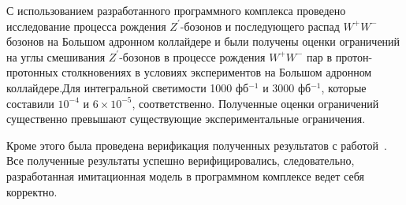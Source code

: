 С использованием разработанного программного комплекса проведено исследование процесса рождения ${Z}^{\prime}$-бозонов и последующего распад ${W}^{+}{W}^{-}$ бозонов на Большом адронном коллайдере и были получены оценки ограничений на углы смешивания ${Z}^{\prime}$-бозонов в
процессе рождения ${W}^{+}$${W}^{-}$ пар в протон-протонных столкновениях
в условиях экспериментов на Большом адронном коллайдере.Для интегральной светимости 1000 фб${}^{-1}$ и 3000 фб${}^{-1}$, которые составили  ${10}^{-4}$ и $6\times{10}^{-5}$, соответственно. Полученные оценки ограничений существенно превышают существующие экспериментальные ограничения.

Кроме этого была проведена верификация полученных результатов с
работой~\cite{2part-pankov}. Все полученные результаты успешно верифицировались,
следовательно, разработанная имитационная модель в программном комплексе
ведет себя корректно.